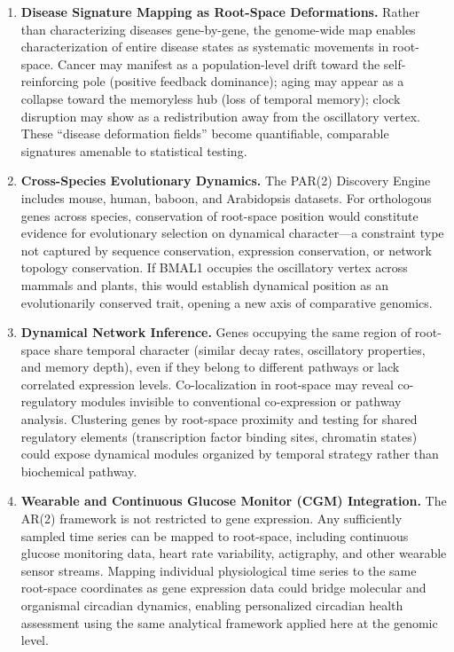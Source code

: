 \documentclass[11pt,letterpaper]{article}
\begin{document}
\begin{enumerate}[leftmargin=*, label=\textbf{\arabic*.}]
\item \textbf{Disease Signature Mapping as Root-Space Deformations.}
Rather than characterizing diseases gene-by-gene, the genome-wide map enables characterization of entire disease states as systematic movements in root-space. Cancer may manifest as a population-level drift toward the self-reinforcing pole (positive feedback dominance); aging may appear as a collapse toward the memoryless hub (loss of temporal memory); clock disruption may show as a redistribution away from the oscillatory vertex. These ``disease deformation fields'' become quantifiable, comparable signatures amenable to statistical testing.

\item \textbf{Cross-Species Evolutionary Dynamics.}
The PAR(2) Discovery Engine includes mouse, human, baboon, and Arabidopsis datasets. For orthologous genes across species, conservation of root-space position would constitute evidence for evolutionary selection on dynamical character---a constraint type not captured by sequence conservation, expression conservation, or network topology conservation. If BMAL1 occupies the oscillatory vertex across mammals and plants, this would establish dynamical position as an evolutionarily conserved trait, opening a new axis of comparative genomics.

\item \textbf{Dynamical Network Inference.}
Genes occupying the same region of root-space share temporal character (similar decay rates, oscillatory properties, and memory depth), even if they belong to different pathways or lack correlated expression levels. Co-localization in root-space may reveal co-regulatory modules invisible to conventional co-expression or pathway analysis. Clustering genes by root-space proximity and testing for shared regulatory elements (transcription factor binding sites, chromatin states) could expose dynamical modules organized by temporal strategy rather than biochemical pathway.

\item \textbf{Wearable and Continuous Glucose Monitor (CGM) Integration.}
The AR(2) framework is not restricted to gene expression. Any sufficiently sampled time series can be mapped to root-space, including continuous glucose monitoring data, heart rate variability, actigraphy, and other wearable sensor streams. Mapping individual physiological time series to the same root-space coordinates as gene expression data could bridge molecular and organismal circadian dynamics, enabling personalized circadian health assessment using the same analytical framework applied here at the genomic level.


\end{enumerate}
\end{document}

